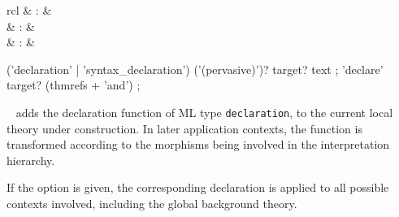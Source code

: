 \begin{isabellebody}
\begin{isamarkuptext}
  \begin{matharray}{rcl}
    \hypertarget{command.declaration}{\hyperlink{command.declaration}{\mbox{}}} & : &  \\
    \hypertarget{command.syntax-declaration}{\hyperlink{command.syntax-declaration}{\mbox{}}} & : &  \\
    \hypertarget{command.declare}{\hyperlink{command.declare}{\mbox{}}} & : &  \\
  \end{matharray}

  \begin{rail}
    ('declaration' | 'syntax_declaration') ('(pervasive)')? target? text
    ;
    'declare' target? (thmrefs + 'and')
    ;
  \end{rail}

  \begin{description}

  \item \hyperlink{command.declaration}{\mbox{}}~ adds the declaration
  function  of ML type \verb|declaration|, to the current
  local theory under construction.  In later application contexts, the
  function is transformed according to the morphisms being involved in
  the interpretation hierarchy.

  If the  option is given, the corresponding
  declaration is applied to all possible contexts involved, including
  the global background theory.


\end{description}
\end{isamarkuptext}
\end{isabellebody}
